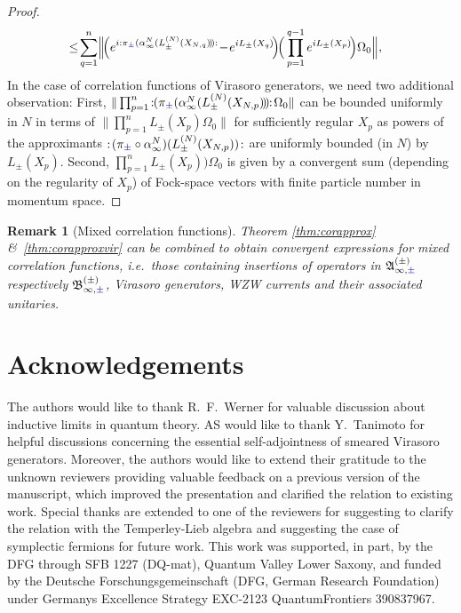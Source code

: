 \documentclass[a4paper, 11pt]{article}
\newcommand{\fA}{\mathfrak{A}}\newcommand{\cA}{\mathcal{A}}\newcommand{\dA}{\mathds{A}}\newcommand{\sA}{\mathscr{A}}
\newcommand{\fB}{\mathfrak{B}}\newcommand{\cB}{\mathcal{B}}\newcommand{\dB}{\mathds{B}}\newcommand{\sB}{\mathscr{B}}
\DeclareMathOperator{\1}{\mathds{1}}
\newtheorem{rem}[thm]{Remark}
\begin{document}
\begin{proof}
\begin{align}
& \!\leq\!\sum^{n}_{q=1}\!\Big\|\!\Big(e^{i:\pi_{{\color{blue}\pm}}(\alpha^{N}_{\infty}(L^{(N)}_{\pm}(X_{N,q})\!)\!):}\!-\!e^{iL_{\pm}(X_{q})}\!\Big)\!\Big(\prod_{p=1}^{q-1}e^{iL_{\pm}(X_{p})}\!\Big)\Omega_{0}\Big\|,
\end{align}
In the case of correlation functions of Virasoro generators, we need two additional observation: First, $\|\prod_{p=1}^{n}\!:\!\!(\pi_{{\color{blue}\pm}}(\alpha^{N}_{\infty}(L^{(N)}_{\pm}(X_{N,p})\!)\!)\!\!:\!\Omega_{0}\|$ can be bounded uniformly in $N$ in terms of $\|\prod_{p=1}^{n}L_{\pm}(X_{p})\Omega_{0}\|$ for sufficiently regular $X_{p}$ as powers of the approximants $:\!(\pi_{{\color{blue}\pm}}\circ\alpha^{N}_{\infty})(L^{(N)}_{\pm}(X_{N,p}))\!:$ are uniformly bounded (in $N$) by $L_{\pm}(X_{p})$. Second, $\prod_{p=1}^{n}L_{\pm}(X_{p}))\Omega_{0}$ is given by a convergent sum (depending on the regularity of $X_{p}$) of Fock-space vectors with finite particle number in momentum space.
\end{proof}
\begin{rem}[Mixed correlation functions]
\label{rem:corapproxvir}
Theorem \ref{thm:corapprox} \& \ref{thm:corapproxvir} can be combined to obtain convergent expressions for mixed correlation functions, i.e.~those containing insertions of operators in $\fA^{(\pm)}_{\infty,{\color{blue}\pm}}$ respectively $\fB^{(\pm)}_{\infty,{\color{blue}\pm}}$, Virasoro generators, WZW currents and their associated unitaries.
\end{rem}

\section*{Acknowledgements}
The authors would like to thank R.~F.~Werner for valuable discussion about inductive limits in quantum theory. AS would like to thank Y.~Tanimoto for helpful discussions concerning the essential self-adjointness of smeared Virasoro generators. Moreover, the authors would like to extend their gratitude to the unknown reviewers providing valuable feedback on a previous version of the manuscript, which improved the presentation and clarified the relation to existing work. Special thanks are extended to one of the reviewers for suggesting to clarify the relation with the Temperley-Lieb algebra and suggesting the case of symplectic fermions for future work. This work was supported, in part, by the DFG through SFB 1227 (DQ-mat), Quantum Valley Lower Saxony, and funded by the Deutsche Forschungsgemeinschaft (DFG, German Research Foundation) under Germanys Excellence Strategy EXC-2123 QuantumFrontiers 390837967.
\end{document}
